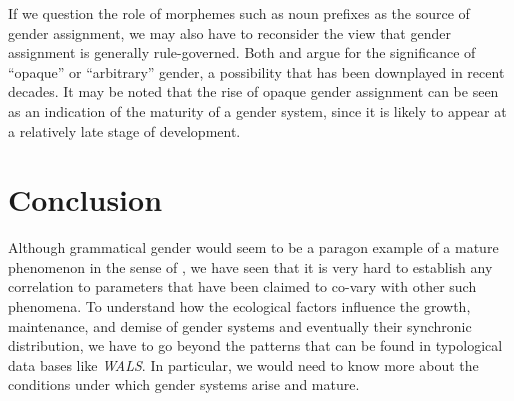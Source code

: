 \documentclass[output=collectionpaper]{langsci/langscibook}
\begin{document}
If we question the role of morphemes such as  noun prefixes as the source of gender assignment, we may also have to reconsider the view that gender assignment is generally rule-governed. Both  and  argue for the significance of ``opaque'' or ``arbitrary'' gender, a possibility that has been downplayed in recent decades. It may be noted that the rise of opaque gender assignment can be seen as an indication of the maturity of a gender system, since it is likely to appear at a relatively late stage of development.

\section{Conclusion}

Although grammatical gender would seem to be a paragon example of a mature phenomenon in the sense of \citet{Dahl2004}, we have seen that it is very hard to establish any correlation to parameters that have been claimed to co-vary with other such phenomena. To understand how the ecological factors influence the growth, maintenance, and demise of gender systems and eventually their synchronic distribution, we have to go beyond the patterns that can be found in typological data bases like \textit{WALS}. In particular, we would need to know more about the conditions under which gender systems arise and mature.

\printbibliography[heading=subbibliography,notkeyword=this]
\end{document}
